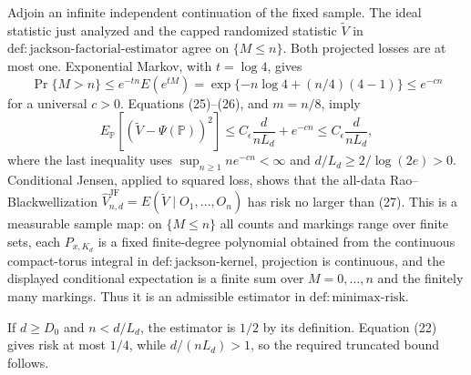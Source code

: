 Adjoin an infinite independent continuation of the fixed sample.  The ideal statistic just analyzed and the capped randomized statistic \(\widetilde V\) in \(\mathrm{def:jackson\text{-}factorial\text{-}estimator}\) agree on \(\{M\leq n\}\).  Both projected losses are at most one.  Exponential Markov, with \(t=\log4\), gives
\[
 \Pr\{M>n\}
 \leq e^{-tn}E(e^{tM})
 =\exp\{-n\log4+(n/4)(4-1)\}
 \leq e^{-c n}
 \tag{26}
\]
for a universal \(c>0\).  Equations (25)--(26), and \(m=n/8\), imply
\[
 E_{\mathbb P}[(\widetilde V-\Psi(\mathbb P))^2]
 \leq C_\epsilon\frac d{nL_d}+e^{-cn}
 \leq C_\epsilon\frac d{nL_d},
 \tag{27}
\]
where the last inequality uses \(\sup_{n\geq1}ne^{-cn}<\infty\) and \(d/L_d\geq2/\log(2e)>0\).  Conditional Jensen, applied to squared loss, shows that the all-data Rao--Blackwellization
\(\widehat V_{n,d}^{\mathrm{JF}}=E(\widetilde V\mid O_1,\ldots,O_n)\) has risk no larger than (27).
This is a measurable sample map: on \(\{M\leq n\}\) all counts and markings range over finite sets, each \(P_{x,K_d}\) is a fixed finite-degree polynomial obtained from the continuous compact-torus integral in \(\mathrm{def:jackson\text{-}kernel}\), projection is continuous, and the displayed conditional expectation is a finite sum over \(M=0,\ldots,n\) and the finitely many markings.  Thus it is an admissible estimator in \(\mathrm{def:minimax\text{-}risk}\).

If \(d\geq D_0\) and \(n<d/L_d\), the estimator is \(1/2\) by its definition.  Equation (22) gives risk at most \(1/4\), while \(d/(nL_d)>1\), so the required truncated bound follows.

